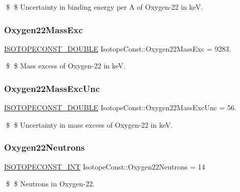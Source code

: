 \$ \$ Uncertainty in binding energy per A of Oxygen-\/22 in keV. \mbox{\label{group___isotope_const-_oxygen-_o22_gac89fcb1003fffecc83ee7ad3992a1fe1}} 
\subsubsection{\texorpdfstring{Oxygen22\+Mass\+Exc}{Oxygen22MassExc}}
{\footnotesize\ttfamily \mbox{\hyperlink{group___isotope_const-_macros_ga8f45a7272ce02c0b4c65c44636ed719a}{I\+S\+O\+T\+O\+P\+E\+C\+O\+N\+S\+T\+\_\+\+D\+O\+U\+B\+LE}} Isotope\+Const\+::\+Oxygen22\+Mass\+Exc = 9283.}

\$ \$ Mass excess of Oxygen-\/22 in keV. \mbox{\label{group___isotope_const-_oxygen-_o22_gacb4b2a9167f8c9439bff7644a49f0099}} 
\subsubsection{\texorpdfstring{Oxygen22\+Mass\+Exc\+Unc}{Oxygen22MassExcUnc}}
{\footnotesize\ttfamily \mbox{\hyperlink{group___isotope_const-_macros_ga8f45a7272ce02c0b4c65c44636ed719a}{I\+S\+O\+T\+O\+P\+E\+C\+O\+N\+S\+T\+\_\+\+D\+O\+U\+B\+LE}} Isotope\+Const\+::\+Oxygen22\+Mass\+Exc\+Unc = 56.}

\$ \$ Uncertainty in mass excess of Oxygen-\/22 in keV. \mbox{\label{group___isotope_const-_oxygen-_o22_gaab540bf3098885ffaa97b6f7363a1b3e}} 
\subsubsection{\texorpdfstring{Oxygen22\+Neutrons}{Oxygen22Neutrons}}
{\footnotesize\ttfamily \mbox{\hyperlink{group___isotope_const-_macros_ga5f18360b3e99483a35c32d789e62621c}{I\+S\+O\+T\+O\+P\+E\+C\+O\+N\+S\+T\+\_\+\+I\+NT}} Isotope\+Const\+::\+Oxygen22\+Neutrons = 14}

\$ \$ Neutrons in Oxygen-\/22. \mbox{\label{group___isotope_const-_oxygen-_o22_ga3201a642435c22358206aefff772d6ca}} 
